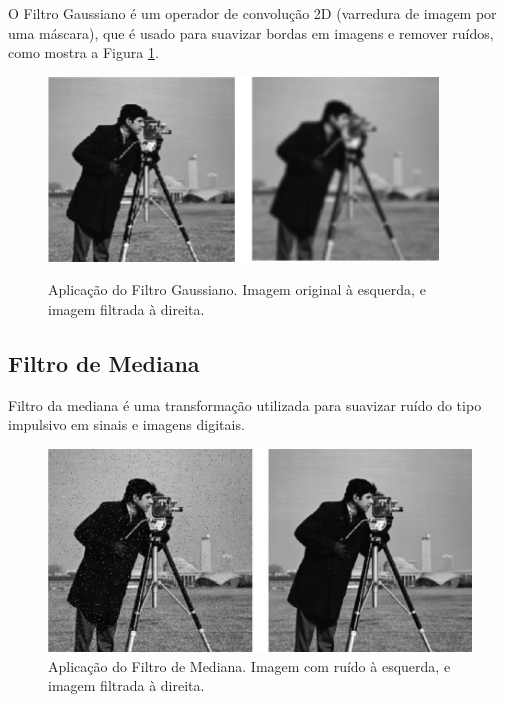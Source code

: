 O Filtro Gaussiano é um operador de convolução 2D (varredura de imagem por uma máscara), que é usado para suavizar bordas em imagens e remover ruídos, como mostra a Figura \ref{fig:gaussian_filter}.

\begin{figure}[H]
    \centering
    \caption{Aplicação do Filtro Gaussiano. Imagem original à esquerda, e imagem filtrada à direita.}
    \includegraphics[scale=0.8]{dados/figuras/image_gaussian_filter.png}
    \label{fig:gaussian_filter}    
\end{figure}

\subsection{Filtro de Mediana}
\label{sec:median_filter}

Filtro da mediana é uma transformação utilizada para suavizar ruído do tipo impulsivo em sinais e imagens digitais.

\begin{figure}[H]
    \centering
    \caption{Aplicação do Filtro de Mediana. Imagem com ruído à esquerda, e imagem filtrada à direita.}
    \includegraphics[scale=0.45]{dados/figuras/image_median_filter.png}    
\end{figure}
